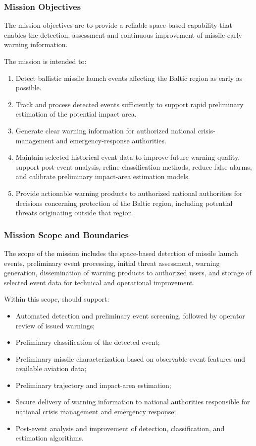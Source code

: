 \subsubsection{Mission Objectives}

The  mission objectives are to provide a reliable space-based capability that enables the detection, assessment and continuous improvement of missile early warning information.

The mission is intended to:

\begin{enumerate}
    \item Detect ballistic missile launch events affecting the Baltic region as early as possible.
    \item Track and process detected events sufficiently to support rapid preliminary estimation of the potential impact area.
    \item Generate clear warning information for authorized national crisis-management and emergency-response authorities.
    \item Maintain selected historical event data to improve future warning quality, support post-event analysis, refine classification methods, reduce false alarms, and calibrate preliminary impact-area estimation models.
    \item Provide actionable warning products to authorized national authorities for decisions concerning protection of the Baltic region, including potential threats originating outside that region.
\end{enumerate}

\subsubsection{Mission Scope and Boundaries}

The scope of the  mission includes the space-based detection of missile launch events, preliminary event processing, initial threat assessment, warning generation, dissemination of warning products to authorized users, and storage of selected event data for technical and operational improvement.

Within this scope,  should support:

\begin{itemize}
    \item Automated detection and preliminary event screening, followed by operator review of issued warnings;
    \item Preliminary classification of the detected event;
    \item Preliminary missile characterization based on observable event features and available aviation data;
    \item Preliminary trajectory and impact-area estimation;
    \item Secure delivery of warning information to national authorities responsible for national crisis management and emergency response;
    \item Post-event analysis and improvement of detection, classification, and estimation algorithms.
\end{itemize}

